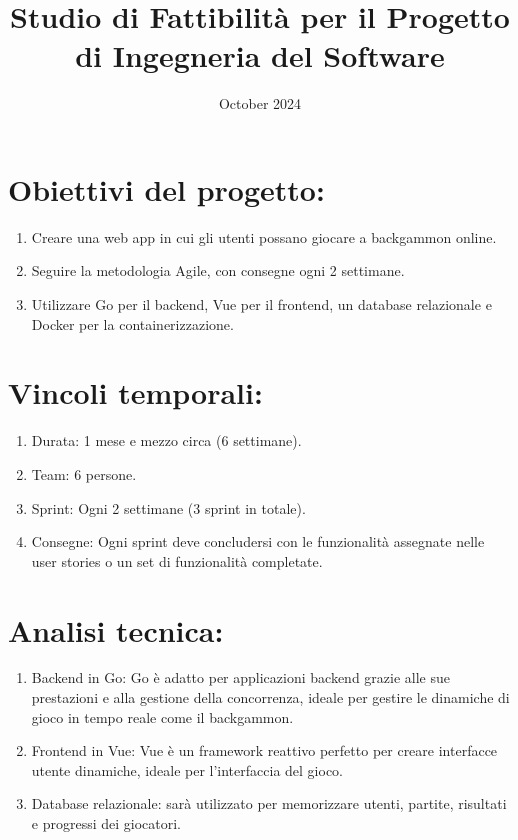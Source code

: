 \documentclass{article}
\title{Studio di Fattibilità per il Progetto di Ingegneria del Software}
\date{October 2024}
\begin{document}
\maketitle

\section{Obiettivi del progetto:}

\begin{enumerate}
    \item    Creare una web app in cui gli utenti possano giocare a backgammon online.
    \item    Seguire la metodologia Agile, con consegne ogni 2 settimane.
    \item    Utilizzare Go per il backend, Vue per il frontend, un database relazionale e Docker per la containerizzazione.
\end{enumerate}

\section{Vincoli temporali:}

\begin{enumerate}
    \item   Durata: 1 mese e mezzo circa (6 settimane).
    \item   Team: 6 persone.
    \item   Sprint: Ogni 2 settimane (3 sprint in totale).
    \item   Consegne: Ogni sprint deve concludersi con le funzionalità assegnate nelle user stories o un set di funzionalità completate.
\end{enumerate}

\section{Analisi tecnica:}

\begin{enumerate}
    \item Backend in Go: Go è adatto per applicazioni backend grazie alle sue prestazioni e alla gestione della concorrenza, ideale per gestire le dinamiche di gioco in tempo reale come il backgammon.
    \item Frontend in Vue: Vue è un framework reattivo perfetto per creare interfacce utente dinamiche, ideale per l'interfaccia del gioco.
    \item Database relazionale: sarà utilizzato per memorizzare utenti, partite, risultati e progressi dei giocatori.
\end{enumerate}
\end{document}
